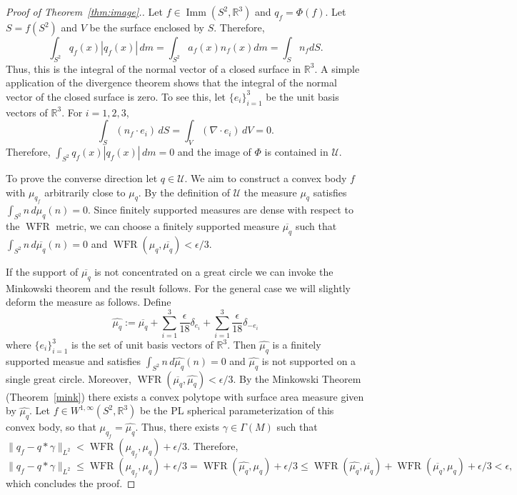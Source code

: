\documentclass[final,hidelinks,onefignum,onetabnum]{siamart220329}
\newcommand{\R}{\mathbb{R}}
\newcommand{\Imm}{\operatorname{Imm}}
\begin{document}
\begin{proof}[Proof of Theorem~\ref{thm:image}.]
    Let $f\in \Imm(S^2,\R^3)$ and $q_f=\Phi(f)$. Let $S=f(S^2)$ and $V$ be the surface enclosed by $S$. Therefore, \[\int_{S^2}q_f(x)|q_f(x)|\,dm=\int_{S^2}a_f(x)n_f(x)dm=\int_S n_f dS.\] Thus, this is the integral of the normal vector of a closed surface in $\R^3$. A simple application of the divergence theorem shows that the integral of  the normal vector of the closed surface is zero. To see this, let $\{e_i\}_{i=1}^3$ be the unit basis vectors of $\R^3$. For $i=1,2,3$, \[\int_S (n_f\cdot e_i)\, dS= \int_V (\nabla \cdot e_i) \,dV = 0. \] Therefore, $\int_{S^2}q_f(x)|q_f(x)|\,dm=0$ and the image of $\Phi$ is contained in $\mathcal{U}$. 
    
    To prove the converse direction let $q\in \mathcal{U}$. We aim to construct a convex body $f$ with $\mu_{q_f}$ arbitrarily close to $\mu_q$. By the definition of $\mathcal{U}$ the measure $\mu_q$  satisfies $\int_{S^2}n\,d\mu_{q}(n)=0$. Since finitely supported measures are dense with respect to the $\operatorname{WFR}$ metric, we can choose a finitely supported measure $\overline{\mu_q}$  such that $\int_{S^2}n\,d\overline{\mu_{q}}(n)=0$ and $\operatorname{WFR}(\mu_q,\overline{\mu_q})<\epsilon/3$.
    
    If the support of $\overline{\mu_q}$ is not concentrated on a great circle we can invoke the Minkowski theorem and the result follows. For the general case we will slightly deform the measure as follows.
    Define \[\hat{\mu_q}:=\overline{\mu_q}+\sum_{i=1}^3\frac{\epsilon}{18} \delta_{e_i}+\sum_{i=1}^3\frac{\epsilon}{18} \delta_{-e_i}\] where $\{e_i\}_{i=1}^3$ is the set of unit basis vectors of $\R^3$. Then $\hat{\mu_q}$ is a finitely supported measue and satisfies $\int_{S^2}n\,d\hat{\mu_q}(n)=0$ and $\hat{\mu_q}$ is not supported on a single great circle. Moreover, $\operatorname{WFR}(\overline{\mu_q},\hat{\mu_q})<\epsilon/3$. By the Minkowski Theorem  (Theorem~\ref{mink}) there exists a convex polytope with surface area measure given by $\hat{\mu_{q}}$. Let $f\in W^{1,\infty}(S^2,\R^3)$ be the PL spherical parameterization of this convex body, so that $\mu_{q_f}=\hat{\mu_{q}}$. Thus, there exists $\gamma\in\Gamma(M)$ such that $\|q_f-q*\gamma\|_{L^2}<\operatorname{WFR}(\mu_{q_f},\mu_q)+\epsilon/3$. Therefore, 
    \begin{equation*}
        \|q_f-q*\gamma\|_{L^2}\leq \operatorname{WFR}(\mu_{q_f},\mu_q)+\epsilon/3= \operatorname{WFR}(\hat{\mu_q},\mu_q)+\epsilon/3 \leq\operatorname{WFR}(\hat{\mu_q},\overline{\mu_q})+\operatorname{WFR}(\overline{\mu_q},\mu_q)+\epsilon/3<\epsilon,
    \end{equation*}
    which concludes the proof.
\end{proof}
\end{document}
